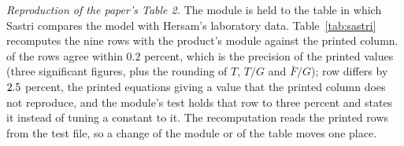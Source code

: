 \emph{Reproduction of the paper's Table 2.} The module is held to the table in which Sastri compares the model with Hersam's laboratory data. Table~\ref{tab:sastri} recomputes the nine rows with the product's module against the printed column. \sastriWithin{} of the \sastriRows{} rows agree within $0.2$ percent, which is the precision of the printed values (three significant figures, plus the rounding of $T$, $T/G$ and $\bar F/G$); row \sastriWorstRow{} differs by $2.5$ percent, the printed
equations giving a value that the printed column does not reproduce, and the module's test holds that row to three percent and states it instead of tuning a constant to it. The recomputation reads the printed rows from the test file, so a change of the module or of the table moves one place.

\begin{table}[!t]
\centering
\caption{Table 2 of Sastri (1994), Hersam's laboratory jaw ($w=0.159$~m, $D=0.206$~m, $N=304$~rpm, $S=9.53$~mm), recomputed by the laboratory-jaw module: the printed and recomputed feed factor $k_{\mathrm F}$ and capacity $Q_{\mathrm S}=V_hk_{\mathrm F}\rho_{\mathrm s}$ (with $k_{\mathrm M}=1$) of the nine rows and their difference in percent. Generated by \texttt{figures/make\_tables.py} from the module and the printed rows held in \texttt{tests/test\_labjaw.py}.}
\label{tab:sastri}
\tiny

\end{table}

